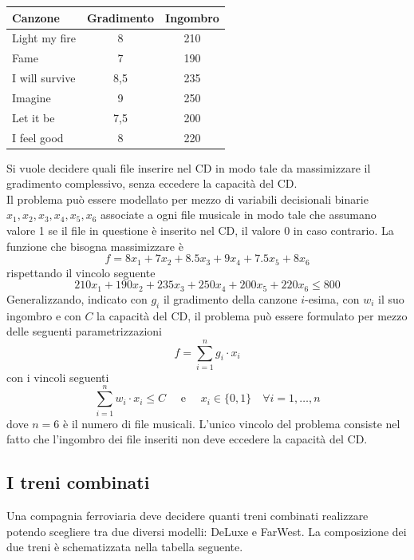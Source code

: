 \documentclass[a4paper]{extarticle}
\renewcommand\arraystretch{}
\begin{document}
\begin{table}[H]
\setlength{\tabcolsep}{8pt}
\renewcommand{\arraystretch}{1.5}
\noindent
\centering
\begin{tabular}{l|c|c}
    \hline
    Canzone & Gradimento & Ingombro\\
    \hline
    Light my fire  & 8   & 210\\
    Fame           & 7   & 190\\
    I will survive & 8,5 & 235\\
    Imagine        & 9   & 250\\
    Let it be      & 7,5 & 200\\
    I feel good    & 8   & 220\\
    \hline
\end{tabular}
\end{table}

\vspace{1em}
\noindent
Si vuole decidere quali file inserire nel CD in modo tale da massimizzare il gradimento complessivo, senza eccedere la capacità del CD.\\
Il problema può essere modellato per mezzo di variabili decisionali binarie $x_1,x_2,x_3,x_4,x_5,x_6$ associate a ogni file musicale in modo tale che assumano valore 1 se il file in questione è inserito nel CD, il valore 0 in caso contrario. La funzione che bisogna massimizzare è
\[f = 8 x_1 + 7 x_2 + 8.5 x_3 + 9 x_4 + 7.5 x_5 + 8 x_6\]
rispettando il vincolo seguente
\[210 x_1 + 190 x_2 + 235 x_3 + 250 x_4 + 200 x_5 + 220 x_6 \leq 800\]
Generalizzando, indicato con $g_i$ il gradimento della canzone $i$-esima, con $w_i$ il suo ingombro e con $C$ la capacità del CD, il problema può essere formulato per mezzo delle seguenti parametrizzazioni
\[f = \sum_{i=1}^n g_i \cdot x_i\]
con i vincoli seguenti
\[\sum_{i=1}^n w_i \cdot x_i \leq C \hspace{1em} \text{ e } \hspace{1em} x_i \in \{0,1\} \hspace{1em} \forall i = 1,\dots,n\]
dove $n = 6$ è il numero di file musicali. L'unico vincolo del problema consiste nel fatto che l'ingombro dei file inseriti non deve eccedere la capacità del CD.

\vspace{1em}
\noindent
\subsection{I treni combinati}
Una compagnia ferroviaria deve decidere quanti treni combinati realizzare potendo scegliere tra due diversi modelli: DeLuxe e FarWest. La composizione dei due treni è schematizzata nella tabella seguente.
\end{document}
